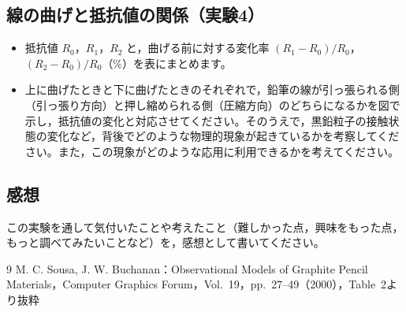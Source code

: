 \subsection{線の曲げと抵抗値の関係（実験4）}
\label{sec:tester-report-bend}

\begin{itemize}
  \item {}抵抗値 $R_0$，$R_1$，$R_2$ と，曲げる前に対する変化率 $(R_1-R_0)/R_0$，$(R_2-R_0)/R_0$（\si{\percent}）を表にまとめます。
  \item {}上に曲げたときと下に曲げたときのそれぞれで，鉛筆の線が引っ張られる側（引っ張り方向）と押し縮められる側（圧縮方向）のどちらになるかを図で示し，抵抗値の変化と対応させてください。そのうえで，黒鉛粒子の接触状態の変化など，背後でどのような物理的現象が起きているかを考察してください。また，この現象がどのような応用に利用できるかを考えてください。
\end{itemize}

\subsection{感想}

この実験を通して気付いたことや考えたこと（難しかった点，興味をもった点，もっと調べてみたいことなど）を，感想として書いてください。

\begin{thebibliography}{9}
    M. C. Sousa, J. W. Buchanan：Observational Models of Graphite Pencil Materials，Computer Graphics Forum，Vol.~19，pp.~27--49（2000），Table~2より抜粋
\end{thebibliography}
